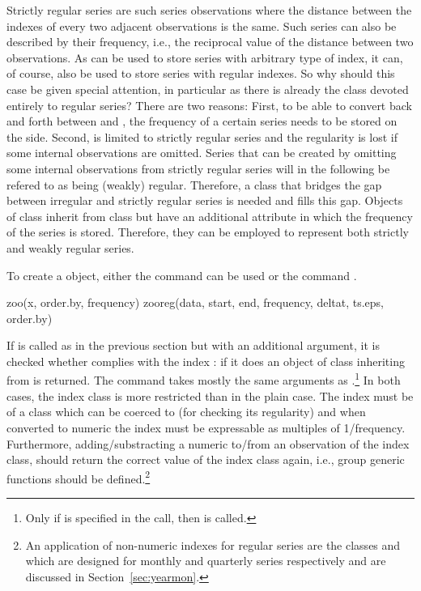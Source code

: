 \documentclass{Z}
\begin{document}
Strictly regular series are such series observations where the distance between
the indexes of every two adjacent observations is the same. Such series can 
also be described by their frequency, i.e., the reciprocal value of the distance
between two observations. As  can be used to store series with arbitrary
type of index, it can, of course, also be used to store series with regular indexes.
So why should this case be given special attention, in particular as there is already
the  class devoted entirely to regular series? There are two reasons: First,
to be able to convert back and forth between  and , the frequency
of a certain series needs to be stored on the  side. Second,  is 
limited to strictly regular series and the regularity is lost if some internal observations
are omitted. Series that can be created by omitting some internal observations from strictly
regular series will in the following be refered to as being (weakly) regular.
Therefore, a class that bridges the gap between irregular and strictly regular series
is needed and  fills this gap. Objects of class  inherit
from class  but have an additional attribute  in which 
the frequency of the series is stored. Therefore, they can be employed to represent
both strictly and weakly regular series.

To create a  object, either the command  can be used
or the command .

\begin{Scode}
zoo(x, order.by, frequency)
zooreg(data, start, end, frequency, deltat, ts.eps, order.by)
\end{Scode} 

If  is called as in the previous section but with an additional
 argument, it is checked whether  complies
with the index : if it does an object of class 
inheriting from  is returned. The command  takes mostly
the same arguments as .\footnote{Only if 
is specified in the  call, then 
is called.} 
In both cases, the index class is more restricted than in the plain 
case. The index must be of a class which can be coerced to  
(for checking its regularity) and when converted to numeric 
the index must be expressable as multiples of 1/frequency. 
Furthermore, adding/substracting
a numeric to/from an observation of the index class, should return the correct value
of the index class again, i.e., group generic functions  should be defined.\footnote{An
application of non-numeric indexes for regular series are the classes 
and  which are designed for monthly and quarterly series respectively
and are discussed in Section~\ref{sec:yearmon}.}
\end{document}
